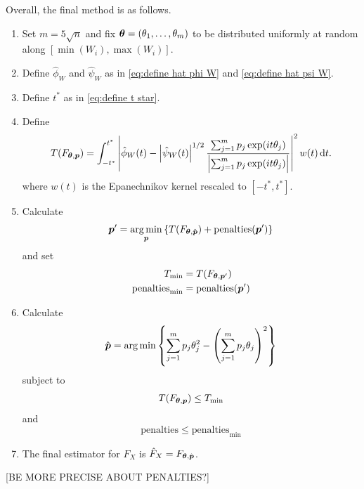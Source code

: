 	Overall, the final method is as follows.

	\begin{enumerate}
		\item Set $m = 5\sqrt{n}$ and fix ${\bm{{\theta}}} = (\theta_1, \dots, \theta_m)$ to be distributed uniformly at random along $[\min(W_i), \max(W_i)]$.
		\item Define $\hat{\phi}_W$ and $\hat{\psi}_W$ as in \eqref{eq:define hat phi W} and \eqref{eq:define hat psi W}.
		\item Define $t^*$ as in \eqref{eq:define t star}.
		\item Define
		\begin{equation}
			T(F_{{\bm{{\theta}}}, {\bm{{p}}}}) = \int_{-t^*}^{t^*} \left| \hat{\phi}_W(t) - \left|\hat{\psi}_W(t)\right|^{1/2} \frac{ \sum_{j = 1}^m p_j \exp(it\theta_j)}{\left| \sum_{j = 1}^m p_j \exp(it\theta_j)\right|} \right|^2 w(t) \, \mathrm{d} t.
		\end{equation}
		where $w(t)$ is the Epanechnikov kernel rescaled to $[-t^*, t^*]$.
		\item
		Calculate
		\begin{equation}
			 {\bm{{p}}}' = \operatorname*{arg\,min}_{{\bm{{p}}}} \left\{T(F_{{\bm{{\theta}}}, \hat{{\bm{{p}}}}}) + \mathrm{penalties}({\bm{{p}}}')\right\}
		\end{equation}
		and set
		\begin{align}
			T_\mathrm{min} &= T(F_{{\bm{{\theta}}}, {\bm{{p}}}'})\\
			\mathrm{penalties}_\mathrm{min} &= \mathrm{penalties}({\bm{{p}}}')
		\end{align}
		\item Calculate
		\begin{equation}
			\hat{{\bm{{p}}}} = \operatorname*{arg\,min} \left\{ \sum_{j = 1}^m p_j \theta_j^2 - \left( \sum_{j=1}^m p_j \theta_j \right)^2 \right\}
		\end{equation}
		subject to
		\begin{equation}
			T(F_{{\bm{{\theta}}}, {\bm{{p}}}}) \leq T_\mathrm{min}
		\end{equation}
		and 
		\begin{equation}
			\mathrm{penalties} \leq \mathrm{penalties}_\mathrm{min}
		\end{equation}
		\item The final estimator for $F_X$ is $\hat{F}_X = F_{{\bm{{\theta}}}, \hat{{\bm{{p}}}}}$.
	\end{enumerate}
	[BE MORE PRECISE ABOUT PENALTIES?]


